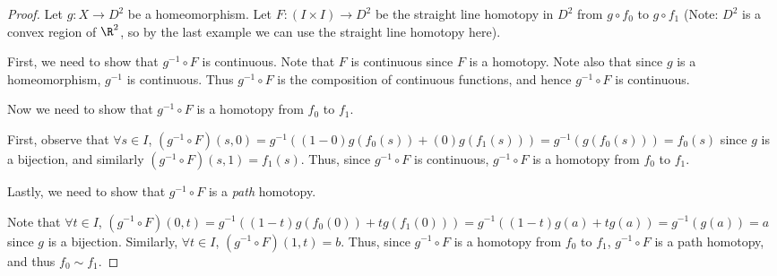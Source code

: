 \begin{proof}
 Let $g: X \rightarrow D^2$ be a homeomorphism. Let $F: (I \times I) \rightarrow D^2$ be the straight line homotopy in $D^2$ from $g \circ f_0$ to $g \circ f_1$ (Note: $D^2$ is a convex region of $\R^2$, so by the last example we can use the straight line homotopy here).
 
 First, we need to show that $g^{-1} \circ F$ is continuous.  Note that $F$ is continuous since $F$ is a homotopy. Note also that since $g$ is a homeomorphism, $g^{-1}$ is continuous. Thus $g^{-1} \circ F$ is the composition of continuous functions, and hence $g^{-1} \circ F$ is continuous.

Now we need to show that $g^{-1} \circ F$ is a homotopy from $f_0$ to $f_1$.

First, observe that $\forall s \in I$, $(g^{-1} \circ F)(s,0) = g^{-1}((1-0)g(f_0(s)) + (0)g(f_1(s))) = g^{-1}(g(f_0(s))) = f_0(s)$ since $g$ is a bijection, and similarly $(g^{-1} \circ F)(s, 1) = f_1(s)$. Thus, since $g^{-1} \circ F$ is continuous, $g^{-1} \circ F$ is a homotopy from $f_0$ to $f_1$.

Lastly, we need to show that $g^{-1} \circ F$ is a \emph{path} homotopy.

Note that $\forall t \in I$, $(g^{-1} \circ F)(0, t) = g^{-1}((1-t)g(f_0(0)) + tg(f_1(0))) = g^{-1}((1-t)g(a) + tg(a)) = g^{-1}(g(a)) = a$ since $g$ is a bijection. Similarly, $\forall t \in I$, $(g^{-1} \circ F)(1,t) = b$. Thus, since $g^{-1} \circ F$ is a homotopy from $f_0$ to $f_1$, $g^{-1} \circ F$ is a path homotopy, and thus $f_0 \sim f_1$. 
\end{proof}

